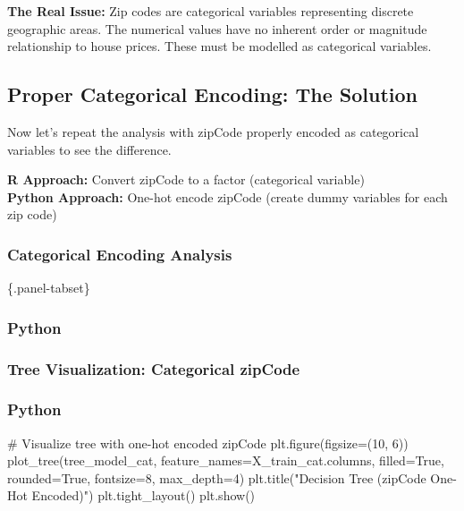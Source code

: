\documentclass[
  letterpaper,
  DIV=11,
  numbers=noendperiod]{scrartcl}
\newenvironment{Shaded}{\begin{snugshade}}{\end{snugshade}}
\newcommand{\CommentTok}[1]{\textcolor[rgb]{0.37,0.37,0.37}{#1}}
\newcommand{\DecValTok}[1]{\textcolor[rgb]{0.68,0.00,0.00}{#1}}
\newcommand{\NormalTok}[1]{\textcolor[rgb]{0.00,0.23,0.31}{#1}}
\newcommand{\OperatorTok}[1]{\textcolor[rgb]{0.37,0.37,0.37}{#1}}
\newcommand{\StringTok}[1]{\textcolor[rgb]{0.13,0.47,0.30}{#1}}
\newcommand{\VariableTok}[1]{\textcolor[rgb]{0.07,0.07,0.07}{#1}}
\begin{document}
\begin{tcolorbox}
\textbf{The Real Issue:} Zip codes are categorical variables
representing discrete geographic areas. The numerical values have no
inherent order or magnitude relationship to house prices. These must be
modelled as categorical variables.

\subsection{Proper Categorical Encoding: The
Solution}\label{proper-categorical-encoding-the-solution}

Now let's repeat the analysis with zipCode properly encoded as
categorical variables to see the difference.

\textbf{R Approach:} Convert zipCode to a factor (categorical
variable)\\
\textbf{Python Approach:} One-hot encode zipCode (create dummy variables
for each zip code)

\subsubsection{Categorical Encoding
Analysis}\label{categorical-encoding-analysis}

\{.panel-tabset\}

\subsubsection{Python}\label{python-3}

\subsubsection{Tree Visualization: Categorical
zipCode}\label{tree-visualization-categorical-zipcode}

\subsubsection{Python}\label{python-4}

\begin{Shaded}
\begin{Highlighting}[]
\CommentTok{\# Visualize tree with one{-}hot encoded zipCode}
\NormalTok{plt.figure(figsize}\OperatorTok{=}\NormalTok{(}\DecValTok{10}\NormalTok{, }\DecValTok{6}\NormalTok{))}
\NormalTok{plot\_tree(tree\_model\_cat, }
\NormalTok{          feature\_names}\OperatorTok{=}\NormalTok{X\_train\_cat.columns,}
\NormalTok{          filled}\OperatorTok{=}\VariableTok{True}\NormalTok{, }
\NormalTok{          rounded}\OperatorTok{=}\VariableTok{True}\NormalTok{,}
\NormalTok{          fontsize}\OperatorTok{=}\DecValTok{8}\NormalTok{,}
\NormalTok{          max\_depth}\OperatorTok{=}\DecValTok{4}\NormalTok{)}
\NormalTok{plt.title(}\StringTok{"Decision Tree (zipCode One{-}Hot Encoded)"}\NormalTok{)}
\NormalTok{plt.tight\_layout()}
\NormalTok{plt.show()}
\end{Highlighting}
\end{Shaded}


\end{tcolorbox}
\end{document}
